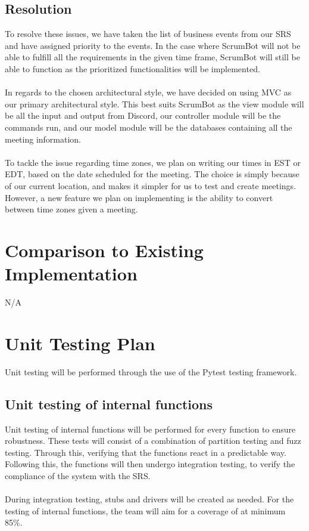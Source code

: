 \documentclass[12pt, titlepage]{article}
\begin{document}
\subsection{Resolution}
To resolve these issues, we have taken the list of business events from our SRS and have assigned priority to the events. In the case where ScrumBot will not be able to fulfill all the requirements in the given time frame, ScrumBot will still be able to function as the prioritized functionalities will be implemented.\\ \\
\noindent In regards to the chosen architectural style, we have decided on using MVC as our primary architectural style. This best suits ScrumBot as the view module will be all the input and output from Discord, our controller module will be the commands run, and our model module will be the databases containing all the meeting information.\\\\
\noindent To tackle the issue regarding time zones, we plan on writing our times in EST or EDT, based on the date scheduled for the meeting. The choice is simply because of our current location, and makes it simpler for us to test and create meetings. However, a new feature we plan on implementing is the ability to convert between time zones given a meeting.
	
\section{Comparison to Existing Implementation}
N/A

\section{Unit Testing Plan}
Unit testing will be performed through the use of the Pytest testing framework.

\subsection{Unit testing of internal functions}
Unit testing of internal functions will be performed for every function to ensure robustness. These tests will consist of a combination of partition testing and fuzz testing. Through this, verifying that the functions react in a predictable way. Following this, the functions will then undergo integration testing, to verify the compliance of the system with the SRS. 
\\\\
\noindent During integration testing, stubs and drivers will be created as needed. For the testing of internal functions, the team will aim for a coverage of at minimum 85\%.
\end{document}
